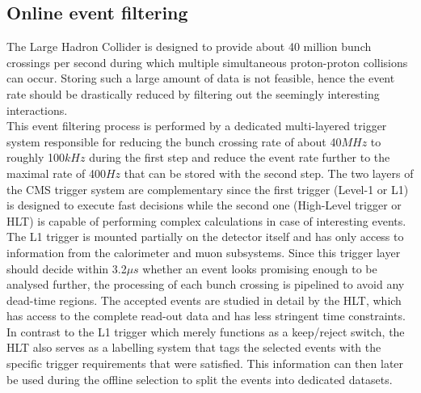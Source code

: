 \subsection{Online event filtering} \label{subsec::L1HLT}
The Large Hadron Collider is designed to provide about 40 million bunch crossings per second during which multiple simultaneous proton-proton collisions can occur. Storing such a large amount of data is not feasible, hence the event rate should be drastically reduced by filtering out the seemingly interesting interactions. 
\\
This event filtering process is performed by a dedicated multi-layered trigger system responsible for reducing the bunch crossing rate of about 40$\unit{MHz}$ to roughly 100$\unit{kHz}$ during the first step and reduce the event rate further to the maximal rate of 400$\unit{Hz}$ that can be stored with the second step. The two layers of the CMS trigger system are complementary since the first trigger (Level-1 or L1) is designed to execute fast decisions while the second one (High-Level trigger or HLT) is capable of performing complex calculations in case of interesting events.
\\
The L1 trigger is mounted partially on the detector itself and has only access to information from the calorimeter and muon subsystems. Since this trigger layer should decide within 3.2$\unit{\mu s}$ whether an event looks promising enough to be analysed further, the processing of each bunch crossing is pipelined to avoid any dead-time regions. The accepted events are studied in detail by the HLT, which has access to the complete read-out data and has less stringent time constraints. In contrast to the L1 trigger which merely functions as a keep/reject switch, the HLT also serves as a labelling system that tags the selected events with the specific trigger requirements that were satisfied. This information can then later be used during the offline selection to split the events into dedicated datasets.

